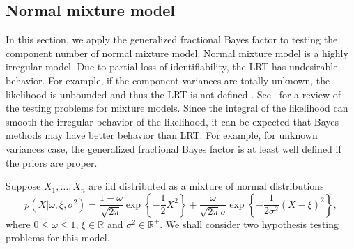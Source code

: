 \documentclass[11pt]{article}
\theoremstyle{plain}
\theoremstyle{definition}
\theoremstyle{remark}
\begin{document}

\subsection{Normal mixture model}\label{sec:mixture}
In this section, we apply the generalized fractional Bayes factor to testing the component number of normal mixture model.
Normal mixture model is a highly irregular model.
Due to partial loss of identifiability, the LRT has undesirable behavior.
For example, if the component variances are totally unknown, the likelihood is unbounded and thus the LRT is not defined \citep{Cam1990Maximum}.
See~\cite{chenjiahua2017} for a review of the testing problems for mixture models.
Since the integral of the likelihood can smooth the irregular behavior of the likelihood, it can be expected that Bayes methods may have better behavior than LRT.
For example, for unknown variances case, the generalized fractional Bayes factor is at least well defined if the priors are proper.

Suppose $X_1,\ldots,X_n$ are iid distributed as a mixture of normal distributions
\begin{equation*}
    p(X|\omega,\xi,\sigma^2)=\frac{1-\omega}{\sqrt{2\pi}}\exp\left\{-\frac{1}{2}X^2\right\}
    +\frac{\omega}{\sqrt{2\pi}\sigma}\exp\left\{ -\frac{1}{2\sigma^2}(X-\xi)^2 \right\},
\end{equation*}
where $0\leq \omega \leq 1$, $\xi\in \mathbb{R}$ and $\sigma^2\in \mathbb{R}^+$.
We shall consider two hypothesis testing problems for this model.
\end{document}
